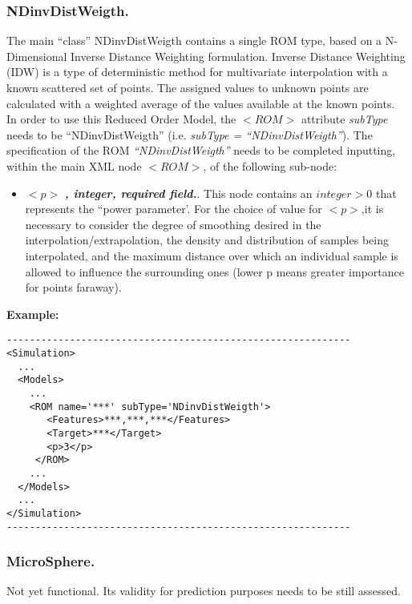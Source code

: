 \subsubsection{NDinvDistWeigth.}
\label{subsubsec:NDinvDistWeigth}
The main ``class'' NDinvDistWeigth contains a single ROM type, based on a N-Dimensional Inverse Distance Weighting formulation. Inverse Distance Weighting (IDW) is a type of deterministic method for multivariate interpolation with a known scattered set of points. The assigned values to unknown points are calculated with a weighted average of the values available at the known points. 
\\In order to use this Reduced Order Model, the $<ROM>$ attribute \textit{subType} needs to be ``NDinvDistWeigth'' (i.e. \textit{subType = ``NDinvDistWeigth''}). The specification of the ROM \textit{``NDinvDistWeigth''} needs to be completed inputting, within the main XML node $<ROM>$, of the following sub-node:
\begin{itemize}
\item $<p>$ \textbf{\textit{, integer, required field.}}. This node contains an $integer > 0$ that represents the ``power parameter'. For the choice of value for $<p>$,it is necessary to consider the degree of smoothing desired in the interpolation/extrapolation, the density and distribution of samples being interpolated, and the maximum distance over which an individual sample is allowed to influence the surrounding ones (lower p means greater importance for points faraway).
\end{itemize}

\textbf{Example:}
\begin{lstlisting}[style=XML]
------------------------------------------------------------
<Simulation>
  ...
  <Models>
    ...
    <ROM name='***' subType='NDinvDistWeigth'>
       <Features>***,***,***</Features> 
       <Target>***</Target>
       <p>3</p>
     </ROM>
    ...
  </Models>
  ...
</Simulation>
------------------------------------------------------------
\end{lstlisting}
\subsubsection{MicroSphere.}
\label{subsubsec:microSphere}
Not yet functional. Its validity for prediction purposes  needs to be still assessed.
